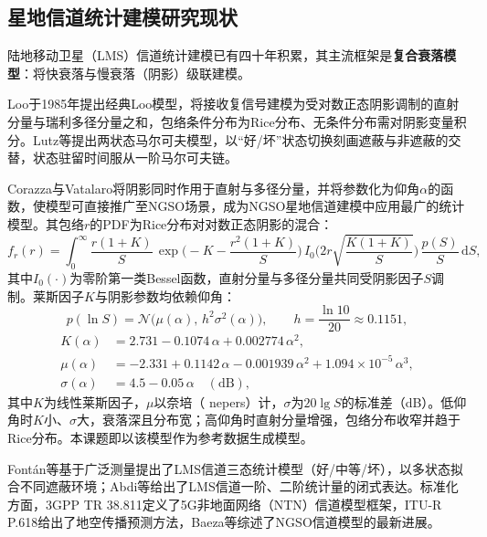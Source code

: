 \documentclass[12pt, a4paper]{ctexart}
\begin{document}
\subsection{星地信道统计建模研究现状}
陆地移动卫星（LMS）信道统计建模已有四十年积累，其主流框架是\textbf{复合衰落模型}：将快衰落与慢衰落（阴影）级联建模。

Loo于1985年提出经典Loo模型\cite{loo1985statistical}，将接收复信号建模为受对数正态阴影调制的直射分量与瑞利多径分量之和，包络条件分布为Rice分布、无条件分布需对阴影变量积分。Lutz等\cite{lutz1991land}提出两状态马尔可夫模型，以“好/坏”状态切换刻画遮蔽与非遮蔽的交替，状态驻留时间服从一阶马尔可夫链。

Corazza与Vatalaro\cite{corazza1994statistical}将阴影同时作用于直射与多径分量，并将参数化为仰角$\alpha$的函数，使模型可直接推广至NGSO场景，成为NGSO星地信道建模中应用最广的统计模型。其包络$r$的PDF为Rice分布对对数正态阴影的混合：
\begin{equation}
f_r(r)=\int_0^\infty \frac{r(1+K)}{S}\,\exp\!\Big(-K-\frac{r^2(1+K)}{S}\Big)\, I_0\!\Big(2r\sqrt{\frac{K(1+K)}{S}}\Big)\,\frac{p(S)}{S}\,\mathrm{d}S,
\label{eq:corazza-pdf}
\end{equation}
其中$I_0(\cdot)$为零阶第一类Bessel函数，直射分量与多径分量共同受阴影因子$S$调制。莱斯因子$K$与阴影参数均依赖仰角：
\begin{equation}
p(\ln S)=\mathcal{N}\big(\mu(\alpha),\, h^2\sigma^2(\alpha)\big),\qquad h=\frac{\ln 10}{20}\approx 0.1151,
\label{eq:shadow}
\end{equation}
\begin{align}
K(\alpha) &= 2.731 - 0.1074\,\alpha + 0.002774\,\alpha^2, \label{eq:K-alpha}\\
\mu(\alpha) &= -2.331 + 0.1142\,\alpha - 0.001939\,\alpha^2 + 1.094\times 10^{-5}\,\alpha^3, \label{eq:mu-alpha}\\
\sigma(\alpha) &= 4.5 - 0.05\,\alpha \quad (\text{dB}), \label{eq:sigma-alpha}
\end{align}
其中$K$为线性莱斯因子，$\mu$以奈培（ nepers）计，$\sigma$为$20\lg S$的标准差（dB）。低仰角时$K$小、$\sigma$大，衰落深且分布宽；高仰角时直射分量增强，包络分布收窄并趋于Rice分布。本课题即以该模型作为参考数据生成模型。

Fontán等\cite{fontan2001statistical}基于广泛测量提出了LMS信道三态统计模型（好/中等/坏），以多状态拟合不同遮蔽环境；Abdi等\cite{abdi2003new}给出了LMS信道一阶、二阶统计量的闭式表达。标准化方面，3GPP TR 38.811\cite{3gpp38811}定义了5G非地面网络（NTN）信道模型框架，ITU-R P.618\cite{itu618}给出了地空传播预测方法，Baeza等\cite{baeza2022overview}综述了NGSO信道模型的最新进展。
\end{document}
